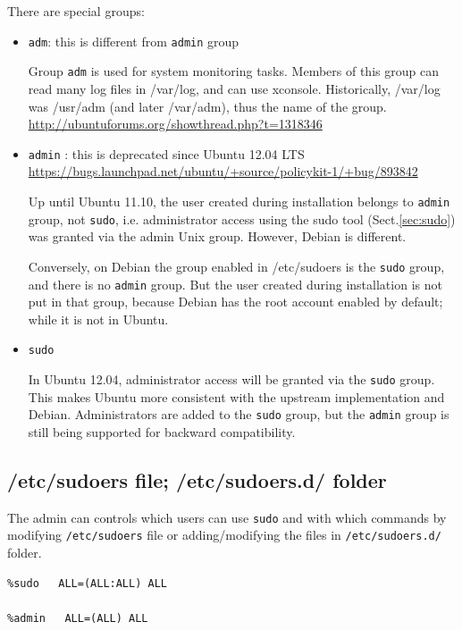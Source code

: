 There are special groups:
\begin{itemize}
  \item \verb!adm!: this is different from \verb!admin! group 
  
  Group \verb!adm! is used for system monitoring tasks. Members of this group
  can read many log files in /var/log, and can use xconsole. Historically, /var/log
  was /usr/adm (and later /var/adm), thus the name of the group.
  \url{http://ubuntuforums.org/showthread.php?t=1318346} 
  
  \item \verb!admin! : this is deprecated since Ubuntu 12.04 LTS
  \url{https://bugs.launchpad.net/ubuntu/+source/policykit-1/+bug/893842} 
  
  Up until Ubuntu 11.10, the user created during installation belongs to
  \verb!admin! group, not \verb!sudo!, i.e. administrator access using the sudo
  tool (Sect.\ref{sec:sudo}) was granted via the admin Unix group. However,
  Debian is different.
  
  Conversely, on Debian the group enabled in /etc/sudoers is the \verb!sudo!
  group, and there is no \verb!admin! group. But the user created during
  installation is not put in that group, because Debian has the root account
  enabled by default; while it is not in Ubuntu.
  
  \item \verb!sudo!
  
  In Ubuntu 12.04, administrator access will be granted via the \verb!sudo!
  group. This makes Ubuntu more consistent with the upstream implementation
  and Debian. Administrators are added to the \verb!sudo! group, but the
  \verb!admin! group is still being supported for backward compatibility.
\end{itemize}




\subsection{/etc/sudoers file;  /etc/sudoers.d/ folder}
\label{sec:etc/sudoers}

The admin can controls which users can use \verb!sudo! and with which commands
by modifying \verb!/etc/sudoers! file or adding/modifying the files in
\verb!/etc/sudoers.d/! folder.

\begin{verbatim}
%sudo   ALL=(ALL:ALL) ALL

%admin   ALL=(ALL) ALL
\end{verbatim}
\label{sec:sudoers-file}

